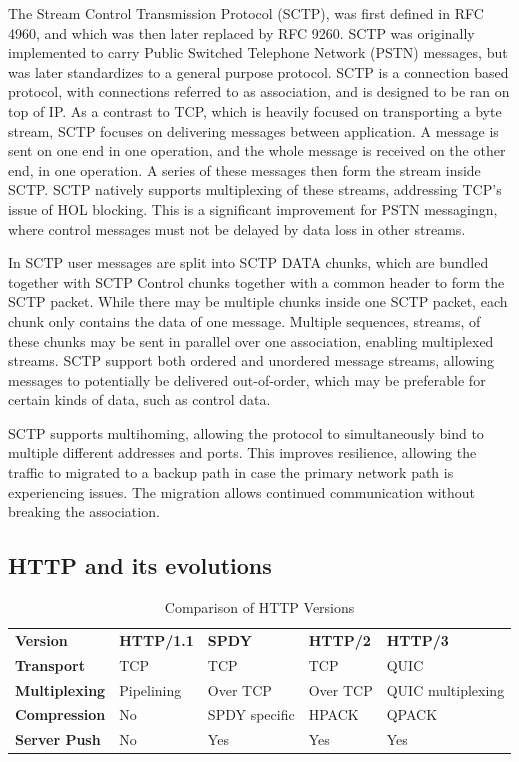 \documentclass[english, 12pt, a4paper, elec, utf8, a-2b, online]{aaltothesis}
\begin{document}
The Stream Control Transmission Protocol (SCTP), was first defined in RFC 4960\cite{rfc4960}, and
which was then later replaced by RFC 9260\cite{rfc4960}. SCTP was originally implemented
to carry Public Switched Telephone Network (PSTN) messages, but was later standardizes
to a general purpose protocol. SCTP is a connection based protocol, with connections
referred to as association, and is designed to be ran on top of IP. As a contrast
to TCP, which is heavily focused on transporting a byte stream, SCTP focuses on delivering
messages between application. A message is sent on one end in one operation, and
the whole message is received on the other end, in one operation. A series of these
messages then form the stream inside SCTP. SCTP natively supports multiplexing of these streams, addressing TCP's issue
of HOL blocking. This is a significant improvement for PSTN messagingn, where control
messages must not be delayed by data loss in other streams\cite{rfc9260}.

In SCTP user messages are split into SCTP DATA chunks, which are bundled together
with SCTP Control chunks together with a common header to form the SCTP packet. While
there may be multiple chunks inside one SCTP packet, each chunk only contains the data
of one message. Multiple sequences, streams, of these chunks may be sent in parallel
over one association, enabling multiplexed streams. SCTP support both ordered and
unordered message streams, allowing messages to potentially be delivered out-of-order,
which may be preferable for certain kinds of data, such as control data\cite{rfc9260}.

SCTP supports multihoming, allowing the protocol to simultaneously bind to multiple
different addresses and ports. This improves resilience, allowing the traffic to migrated
to a backup path in case the primary network path is experiencing issues. The migration
allows continued communication without breaking the association\cite{rfc9260}.

\subsection{HTTP and its evolutions}

\begin{table}[h]
	\centering
	\caption{Comparison of HTTP Versions}
	\label{tab:http_versions}
	\begin{tabular}{lllll}
	\textbf{Version} & \textbf{HTTP/1.1} & \textbf{SPDY} & \textbf{HTTP/2} & \textbf{HTTP/3} \\
	\textbf{Transport}    & TCP     & TCP & TCP & QUIC    \\
	\textbf{Multiplexing} & Pipelining    & Over TCP & Over TCP & QUIC multiplexing    \\
	\textbf{Compression}  & No    & SPDY specific & HPACK & QPACK    \\
	\textbf{Server Push} & No & Yes & Yes & Yes \\
	\end{tabular}
\end{table}
\end{document}
